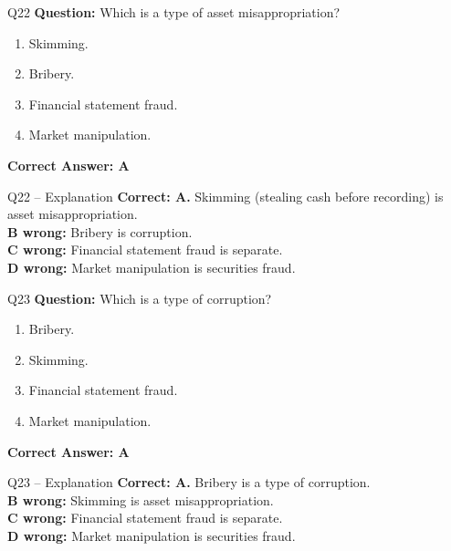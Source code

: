 \documentclass[aspectratio=169,10pt]{beamer}
\begin{document}
	\begin{frame}[t]{Q22}
		\small
		\textbf{Question:} Which is a type of asset misappropriation?
		\begin{enumerate}[label=\Alph*.,itemsep=1pt,topsep=2pt]
			\item Skimming.
			\item Bribery.
			\item Financial statement fraud.
			\item Market manipulation.
		\end{enumerate}
		\vspace{4pt}
		\textbf{Correct Answer: A}
	\end{frame}
	
	\begin{frame}[t]{Q22 -- Explanation}
		\small
		\textbf{Correct: A.} Skimming (stealing cash before recording) is asset misappropriation. \\[4pt]
		\textbf{B wrong:} Bribery is corruption. \\[2pt]
		\textbf{C wrong:} Financial statement fraud is separate. \\[2pt]
		\textbf{D wrong:} Market manipulation is securities fraud.
	\end{frame}
	
	\begin{frame}[t]{Q23}
		\small
		\textbf{Question:} Which is a type of corruption?
		\begin{enumerate}[label=\Alph*.,itemsep=1pt,topsep=2pt]
			\item Bribery.
			\item Skimming.
			\item Financial statement fraud.
			\item Market manipulation.
		\end{enumerate}
		\vspace{4pt}
		\textbf{Correct Answer: A}
	\end{frame}
	
	\begin{frame}[t]{Q23 -- Explanation}
		\small
		\textbf{Correct: A.} Bribery is a type of corruption. \\[4pt]
		\textbf{B wrong:} Skimming is asset misappropriation. \\[2pt]
		\textbf{C wrong:} Financial statement fraud is separate. \\[2pt]
		\textbf{D wrong:} Market manipulation is securities fraud.
	\end{frame}
	
\end{document}
